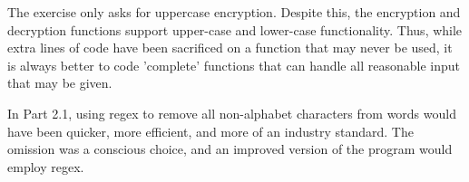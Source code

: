 \documentclass{article}
\begin{document}
The exercise only asks for uppercase encryption. Despite this, the encryption and decryption functions support upper-case and lower-case functionality. Thus, while extra lines of code have been sacrificed on a function that may never be used, it is always better to code 'complete' functions that can handle all reasonable input that may be given.

In Part 2.1, using regex to remove all non-alphabet characters from words would have been quicker, more efficient, and more of an industry standard. The omission was a conscious choice, and an improved version of the program would employ regex.
\end{document}
